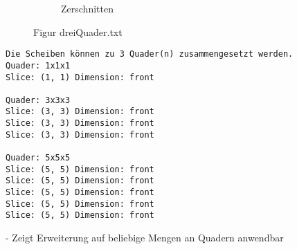 \documentclass[a4paper,10pt,ngerman]{scrartcl}
\newcommand{\simplecube}[8]%
{
    \begin{scope}[shift={#1}]
        \fill[gray!40,canvas is yz plane at x=#2, opacity=#8] (0,0) rectangle (#3,#4);
        \fill[gray!10,canvas is xz plane at y=#3, opacity=#8] (0,0) rectangle (#2,#4);
        \fill[white  ,canvas is xy plane at z=#4, opacity=#8] (0,0) rectangle (#2,#3);
        \foreach\i/\j in {0/1, 1/1, 1/0}
            {
            \draw[line#5] (0,#3*\i,#4*\j) --++ (#2,0,0);
            \draw[line#6] (#2*\i,0,#4*\j) --++ (0,#3,0);
            \draw[line#7] (#2*\i,#3*\j,0) --++ (0,0,#4);
        }
    \end{scope}
}
\begin{document}
\begin{figure}[H]
\begin{subfigure}[b]{0.45\textwidth}
\begin{tikzpicture}[3d view={115}{30},line cap=round,line join=round,scale=0.4]
            \end{tikzpicture}
            \caption{Zerschnitten}\label{fig:figB4}
        \end{subfigure}
        \caption{Figur dreiQuader.txt}\label{fig:figAB4}
    \end{figure}

    \begin{lstlisting}[frame=single, title=Programmausgabe dreiQuader.txt, breaklines=true,label={lst:lstlisting5}]
Die Scheiben können zu 3 Quader(n) zusammengesetzt werden.
Quader: 1x1x1
Slice: (1, 1) Dimension: front

Quader: 3x3x3
Slice: (3, 3) Dimension: front
Slice: (3, 3) Dimension: front
Slice: (3, 3) Dimension: front

Quader: 5x5x5
Slice: (5, 5) Dimension: front
Slice: (5, 5) Dimension: front
Slice: (5, 5) Dimension: front
Slice: (5, 5) Dimension: front
Slice: (5, 5) Dimension: front
    \end{lstlisting}

    - Zeigt Erweiterung auf beliebige Mengen an Quadern anwendbar

    \newpage
\end{document}
